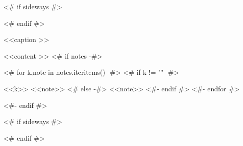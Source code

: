 \begin{<< env  >>}
  \centering
  <# if sideways #>
  \begin{adjustbox}{angle=90}
  <# endif #>
  \begin{threeparttable}
    \caption{<<caption >>}
    <<content >>
    <# if notes -#>
    \begin{tablenotes}
      <# for k,note in notes.iteritems() -#>
      <# if k != "" -#>
      \item [<<k>>] <<note>>
      <# else -#>
      <<note>>
      <#- endif #>
      <#- endfor #>
    \end{tablenotes}
    <#- endif #>
  \end{threeparttable}
  <# if sideways #>
  \end{adjustbox}
  <# endif #>
  \label{tbl:<< id >>}
\end{<< env  >>}
